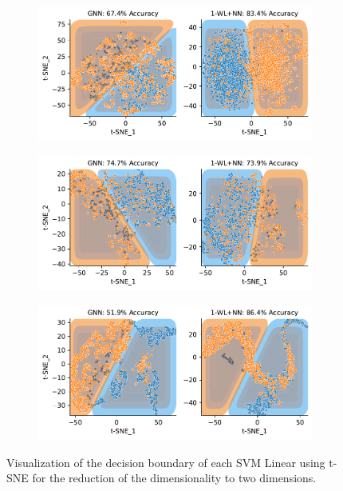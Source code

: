 \begin{figure}[htb]
\begin{subfigure}[b]{0.49\textwidth}
		\vspace*{-4ex} 
		\caption{\mutag}
	\end{subfigure}
	\hfill
	\begin{subfigure}[b]{0.49\textwidth}
		\centering
		\includegraphics[width=\textwidth]{Figures/tsne_svm_lin_NCI1.pdf}
		\vspace*{-4ex} 
		\caption{\nci}
	\end{subfigure}
	\par\bigskip
	\begin{subfigure}[b]{0.49\textwidth}
		\centering
		\includegraphics[width=\textwidth]{Figures/tsne_svm_lin_PROTEINS.pdf}
		\vspace*{-4ex} 
		\caption{\proteins}
	\end{subfigure}
	\hfill
	\begin{subfigure}[b]{0.49\textwidth}
		\centering
		\includegraphics[width=\textwidth]{Figures/tsne_svm_lin_REDDIT.pdf}
		\vspace*{-4ex} 
		\caption{\reddit}
	\end{subfigure}
	\caption{Visualization of the decision boundary of each \textsf{SVM Linear} using \textsf{t-SNE} for the reduction of the dimensionality to two dimensions.}
	\label{fig:pool_svm_tsne}
\end{figure}

